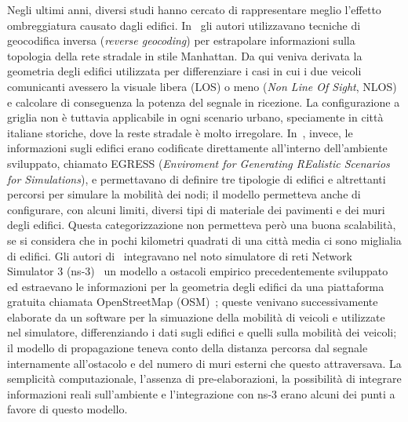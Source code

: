 Negli ultimi anni, diversi studi hanno cercato di rappresentare meglio l'effetto ombreggiatura causato dagli edifici.
In~\cite{Giordano:2010:CST:1860058.1860065} gli autori utilizzavano tecniche di geocodifica inversa (\textit{reverse geocoding}) per estrapolare
informazioni sulla topologia della rete stradale in stile Manhattan. Da qui veniva derivata la geometria degli edifici utilizzata
per differenziare i casi in cui i due veicoli comunicanti avessero la visuale libera (LOS) o meno (\textit{Non Line Of Sight}, NLOS)
e calcolare di conseguenza la potenza del segnale in ricezione.
La configurazione a griglia non è tuttavia applicabile in ogni scenario urbano, speciamente in città italiane storiche,
dove la reste stradale è molto irregolare.
In~\cite{4020783}, invece, le informazioni sugli edifici erano codificate direttamente all'interno dell'ambiente sviluppato, chiamato
EGRESS (\textit{Enviroment for Generating REalistic Scenarios for Simulations}), e permettavano di definire tre tipologie di edifici e altrettanti
percorsi per simulare la mobilità dei nodi; il modello permetteva anche di configurare, con alcuni limiti, diversi tipi di materiale dei pavimenti e dei muri degli edifici.
Questa categorizzazione non permetteva però una buona scalabilità, se si considera che in pochi kilometri quadrati di una città media
ci sono miglialia di edifici.
Gli autori di~\cite{Carpenter:2015:OMI:2756509.2756512} integravano nel noto simulatore di reti Network Simulator 3 (ns-3)~\cite{ns3Website}
un modello a ostacoli empirico precedentemente sviluppato~\cite{5720204} ed
estraevano le informazioni per la geometria degli edifici da una piattaforma gratuita
chiamata OpenStreetMap (OSM)~\cite{osmWebsite}; queste venivano successivamente elaborate da un software per la simuazione della mobilità di veicoli
e utilizzate nel simulatore, differenziando i dati sugli edifici e quelli sulla mobilità dei veicoli;
il modello di propagazione teneva conto della distanza percorsa dal segnale internamente all'ostacolo e del numero di muri esterni che questo attraversava.
La semplicità computazionale, l'assenza di pre-elaborazioni, la possibilità di integrare informazioni reali sull'ambiente
e l'integrazione con ns-3 erano alcuni dei punti a favore di questo modello.
%
